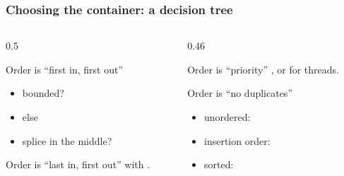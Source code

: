 \documentclass[aspectratio=169,10pt,compress]{beamer}
\begin{document}
\begin{frame}[t,fragile] \frametitle{Choosing the container: a decision tree}
  \begin{columns}[T]
    \begin{column}{0.5\textwidth}
      \begin{block}{Order is ``first in, first out''}
        \small
        \begin{itemize}
          \item bounded? 
          \item else 
          \item splice in the middle? 
        \end{itemize}
      \end{block}
      \begin{block}{Order is ``last in, first out''}
        \small
         with .
      \end{block}
    \end{column}
    \begin{column}{0.46\textwidth}
      \begin{block}{Order is ``priority''}
        \small
        , or  for threads.
      \end{block}
      \begin{block}{Order is ``no duplicates''}
        \small
        \begin{itemize}
          \item unordered: 
          \item insertion order: 
          \item sorted: 
        \end{itemize}
      \end{block}
    \end{column}
  \end{columns}
\end{frame}
\end{document}

